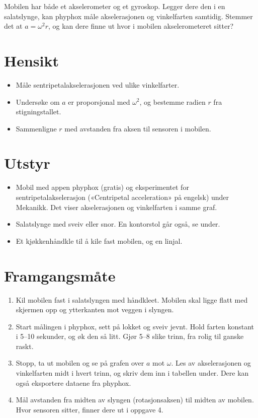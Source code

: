 \documentclass[11pt]{article}
\begin{document}

Mobilen har både et akselerometer og et gyroskop. Legger dere den i en salatslynge, kan phyphox måle akselerasjonen og vinkelfarten samtidig. Stemmer det at $a = ω^{2}r$, og kan dere finne ut hvor i mobilen akselerometeret sitter?

\section*{Hensikt}

\begin{itemize}
\item Måle sentripetalakselerasjonen ved ulike vinkelfarter.
\item Undersøke om $a$ er proporsjonal med $ω^{2}$, og bestemme radien $r$ fra stigningstallet.
\item Sammenligne $r$ med avstanden fra aksen til sensoren i mobilen.
\end{itemize}

\section*{Utstyr}

\begin{itemize}
\item Mobil med appen phyphox (gratis) og eksperimentet for sentripetalakselerasjon («Centripetal acceleration» på engelsk) under Mekanikk. Det viser akselerasjonen og vinkelfarten i samme graf.
\item Salatslynge med sveiv eller snor. En kontorstol går også, se under.
\item Et kjøkkenhåndkle til å kile fast mobilen, og en linjal.
\end{itemize}

\section*{Framgangsmåte}

\begin{enumerate}
\item Kil mobilen fast i salatslyngen med håndkleet. Mobilen skal ligge flatt med skjermen opp og ytterkanten mot veggen i slyngen.
\item Start målingen i phyphox, sett på lokket og sveiv jevnt. Hold farten konstant i 5–10 sekunder, og øk den så litt. Gjør 5–8 slike trinn, fra rolig til ganske raskt.
\item Stopp, ta ut mobilen og se på grafen over $a$ mot $ω$. Les av akselerasjonen og vinkelfarten midt i hvert trinn, og skriv dem inn i tabellen under. Dere kan også eksportere dataene fra phyphox.
\item Mål avstanden fra midten av slyngen (rotasjonsaksen) til midten av mobilen. Hvor sensoren sitter, finner dere ut i oppgave 4.
\end{enumerate}
\end{document}
